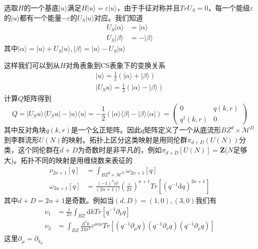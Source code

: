 \documentclass[a4paper]{article}
\numberwithin{equation}{subsection}
\begin{document}
选取$H$的一个基底$|u\rangle$满足$H|u\rangle=\varepsilon|u\rangle$，由于手征对称并且$TrU_S=0$，每一个能级$\varepsilon$的$|u\rangle$都有一个能量$-\varepsilon$的$U_S|u\rangle$对应。我们知道
\begin{equation}
    \begin{split}
        U_S|\alpha\rangle&=|\alpha\rangle\\
        U_S|\beta\rangle&=-|\beta\rangle
    \end{split}
\end{equation}
其中$|\alpha\rangle=|u\rangle+U_S|u\rangle,|\beta\rangle=|u\rangle-U_S|u\rangle$

这样我们可以到从$H$对角表象到CS表象下的变换关系
\begin{equation}
    \begin{split}
        |u\rangle=\frac{1}{2}(|\alpha\rangle+|\beta\rangle)\\
        |U_Su\rangle=\frac{1}{2}(|\alpha\rangle-|\beta\rangle)
    \end{split}
\end{equation}
计算$Q$矩阵得到
\begin{equation}
    Q=|U_Su\rangle\langle U_Su|-|u\rangle\langle u|=-\frac{1}{2}(|\alpha\rangle\langle\beta|-|\beta\rangle\langle\alpha|)=\begin{pmatrix}
        0&q(k,r)\\
        q^\dagger(k,r)&0
    \end{pmatrix}
\end{equation}
其中反对角块$q(k,r)$是一个幺正矩阵。因此$q$矩阵定义了一个从底流形$BZ^d\times \mathcal{M}^D$到李群流形$U(N)$的映射。拓扑上区分这类映射是用同伦群$\pi_{d+D}(U(N))$分类，这个同伦群在$d+D$为奇数时是非平凡的，例如$\pi_{d+D}[U(N)]=\mathbf{Z}$($N$足够大)。拓扑不同的映射是用缠绕数来表征的
\begin{equation}
    \begin{split}
        \nu_{2n+1}[q]&=\int_{BZ^d\times\mathcal{M}^D}\omega_{2n+1}[q]\\
        \omega_{2n+1}[q]&=\frac{(-1)^nn!}{(2n+1)!}\left(\frac{i}{2\pi}\right)^{n+1}Tr[(q^{-1}\mathrm{d}q)^{2n+1}]
    \end{split}
\end{equation}
其中$d+D=2n+1$是奇数。例如当$(d,D)=(1,0),(3,0)$我们有
\begin{equation}
    \begin{split}
        \nu_1&=\frac{i}{2\pi}\int_{BZ}\mathrm{d}kTr[q^{-1}\partial_k q]\\
        \nu_3&=\int_{BZ}\frac{\mathrm{d}^3k}{24\pi^2}\varepsilon^{\mu\nu\rho}Tr[(q^{-1}\partial_\mu q)(q^{-1}\partial_\nu q)(q^{-1}\partial_\rho q)]
    \end{split}
\end{equation}
这里$\partial_\mu=\partial_{k_\mu}$
\end{document}
